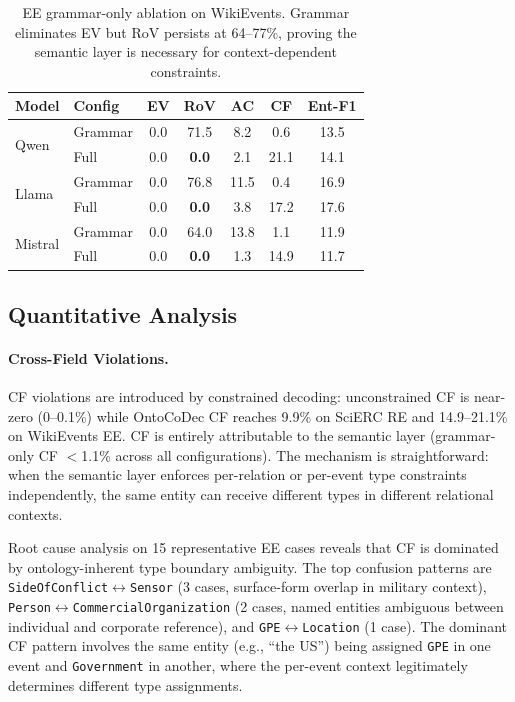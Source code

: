 \documentclass[11pt,a4paper]{article}
\newcommand{\sys}{OntoCoDec}
\newcommand{\bfval}[1]{\textbf{#1}}
\begin{document}
\begin{table}[t]
\centering
\small
\caption{EE grammar-only ablation on WikiEvents. Grammar eliminates EV but RoV persists at 64--77\%, proving the semantic layer is necessary for context-dependent constraints.}
\label{tab:ee_ablation}
\begin{tabular}{llccccc}
\toprule
Model & Config & EV & RoV & AC & CF & Ent-F1 \\
\midrule
\multirow{2}{*}{Qwen} & Grammar & 0.0 & 71.5 & 8.2 & 0.6 & 13.5 \\
 & Full & 0.0 & \bfval{0.0} & 2.1 & 21.1 & 14.1 \\
\midrule
\multirow{2}{*}{Llama} & Grammar & 0.0 & 76.8 & 11.5 & 0.4 & 16.9 \\
 & Full & 0.0 & \bfval{0.0} & 3.8 & 17.2 & 17.6 \\
\midrule
\multirow{2}{*}{Mistral} & Grammar & 0.0 & 64.0 & 13.8 & 1.1 & 11.9 \\
 & Full & 0.0 & \bfval{0.0} & 1.3 & 14.9 & 11.7 \\
\bottomrule
\end{tabular}
\end{table}

\subsection{Quantitative Analysis}
\label{sec:analysis}

\paragraph{Cross-Field Violations.}
CF violations are introduced by constrained decoding: unconstrained CF is near-zero (0--0.1\%) while \sys{} CF reaches 9.9\% on SciERC RE and 14.9--21.1\% on WikiEvents EE. CF is entirely attributable to the semantic layer (grammar-only CF $<$1.1\% across all configurations). The mechanism is straightforward: when the semantic layer enforces per-relation or per-event type constraints independently, the same entity can receive different types in different relational contexts.

Root cause analysis on 15 representative EE cases reveals that CF is dominated by ontology-inherent type boundary ambiguity. The top confusion patterns are \texttt{SideOfConflict}$\leftrightarrow$\texttt{Sensor} (3 cases, surface-form overlap in military context), \texttt{Person}$\leftrightarrow$\texttt{CommercialOrganization} (2 cases, named entities ambiguous between individual and corporate reference), and \texttt{GPE}$\leftrightarrow$\texttt{Location} (1 case). The dominant CF pattern involves the same entity (e.g., ``the US'') being assigned \texttt{GPE} in one event and \texttt{Government} in another, where the per-event context legitimately determines different type assignments.
\end{document}
